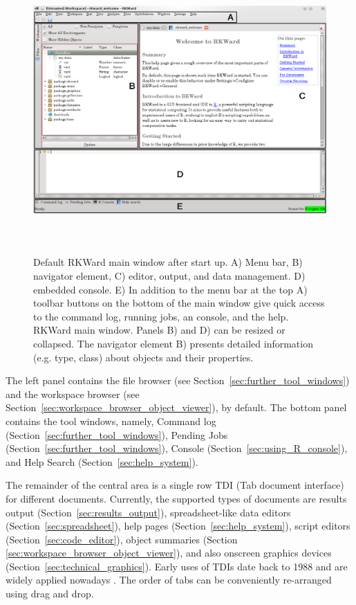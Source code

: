 \begin{figure}[htp]
 \centering
 \includegraphics[width=15.446cm,height=10.949cm]{../figures/main_window.png}
 \caption{Default RKWard main window after start up. 
A) Menu bar, B) navigator element, C) editor, output, 
and data management. D) embedded  console. 
E) In addition to the menu bar at the top A) toolbar buttons 
on the bottom of the main window give quick access to the command log, 
running jobs, an  console, and the  help. 
RKWard main window. Panels B) and D) can be resized or collapsed. The navigator element B)
presents detailed information (e.g. type, class) about objects and their properties.}
 \label{fig:main_window}
\end{figure}

The left panel contains the file browser (see Section~\ref{sec:further_tool_windows}) and the
workspace browser (see Section~\ref{sec:workspace_browser_object_viewer}), by default. The
bottom panel contains the tool windows, namely, Command
log (Section~\ref{sec:further_tool_windows}), Pending Jobs (Section~\ref{sec:further_tool_windows}),  Console
(Section~\ref{sec:using_R_console}), and Help Search (Section~\ref{sec:help_system}).

The remainder of the central area is a single row TDI (Tab document
interface) for different documents. Currently, the supported types of
documents are results output (Section~\ref{sec:results_output}), spreadsheet-like data editors
(Section~\ref{sec:spreadsheet}), help pages (Section~\ref{sec:help_system}), script editors (Section~\ref{sec:code_editor}),
object summaries (Section \ref{sec:workspace_browser_object_viewer}), and also
 onscreen graphics devices (Section~\ref{sec:technical_graphics}). Early uses of TDIs date back to 1988 and are
widely applied nowadays \citep{Hopkins2005, MDN2010,
KimLutteroth2010}. The order of tabs can be conveniently re-arranged
using drag and drop.

